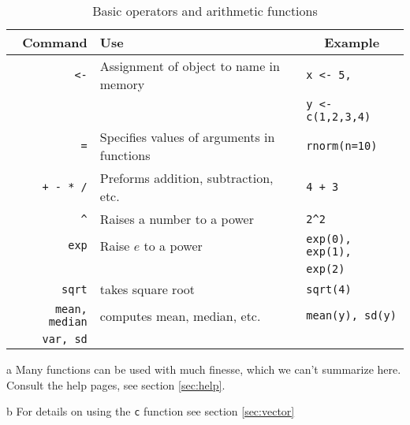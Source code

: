 \documentclass[12pt]{article}
\begin{document}
\begin{table}[!htb]
	\begin{threeparttable}
	\caption{Basic operators and arithmetic functions}

	\begin{tabular}{r l l}
		\hline
		Command 	&	\multicolumn{1}{l}{Use\tnote{a}}		&	\multicolumn{1}{c}{Example}		\\
		\hline
		\verb+<-+		&	Assignment of object to name in memory	&	\verb+x <- 5,+ 				\\
					&									&	\verb+y <- c(1,2,3,4)+\tnote{b}	\\
		\verb+=+		&	Specifies values of arguments in functions	&	\verb+rnorm(n=10)+		\\
		\verb|+ - * /|	&	Preforms addition, subtraction, etc.		&	\verb|4 + 3|				\\
		\verb+^+		&	Raises a number to a power			&	\verb+2^2+				\\
		\verb+exp+	&	Raise $e$ to a power				&	\verb+exp(0), exp(1),+		\\
					&									&	\verb+exp(2)+				\\
		\verb+sqrt+	&	takes square root					&	\verb+sqrt(4)+				\\
		\verb+mean, median+&	computes mean, median, etc. 		&	\verb+mean(y), sd(y)+		\\
		\verb+var, sd+	&									&							\\	
		\hline
	\end{tabular}
	\begin{tablenotes}
		\item[a] Many functions can be used with much finesse, which we can't summarize here. \\Consult the help pages, see section \ref{sec:help}.
		\item[b] For details on using the \texttt{c} function see section \ref{sec:vector}
	\end{tablenotes}
	\end{threeparttable}
\end{table}
\end{document}
